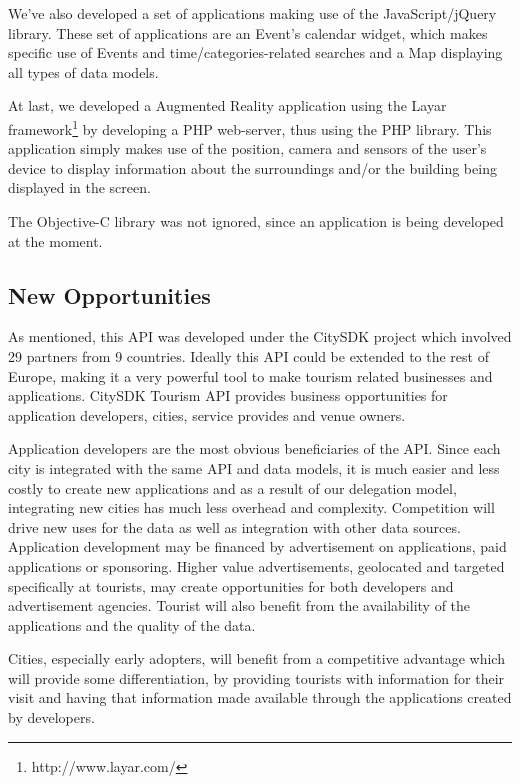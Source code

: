 \documentclass[times,doublespace]{ettauth}%
\begin{document}
We've also developed a set of applications making use of the JavaScript/jQuery library. These set of applications are an Event's calendar widget, which makes specific use of Events and time/categories-related searches and a Map displaying all types of data models.

At last, we developed a Augmented Reality application using the Layar framework\footnote{http://www.layar.com/} by developing a PHP web-server, thus using the PHP library. 
This application simply makes use of the position, camera and sensors of the user's device to display information about the surroundings and/or the building being displayed in the screen.

The Objective-C library was not ignored, since an application is being developed at the moment.

\subsection{New Opportunities}
As mentioned, this API was developed under the CitySDK project which involved 29 partners from 9 countries. 
Ideally this API could be extended to the rest of Europe, making it a very powerful tool to make tourism related businesses and applications.
CitySDK Tourism API provides business opportunities for application developers, cities, service provides and venue owners.

Application developers are the most obvious beneficiaries of the API.
Since each city is integrated with the same API and data models, it is much easier and less costly to create new applications and as a result of our delegation model, integrating new cities has much less overhead and complexity.
Competition will drive new uses for the data as well as integration with other data sources.
Application development may be financed by advertisement on applications, paid applications or sponsoring.
Higher value advertisements, geolocated and targeted specifically at tourists, may create opportunities for both developers and advertisement agencies.
Tourist will also benefit from the availability of the applications and the quality of the data.

Cities, especially early adopters, will benefit from a competitive advantage which will provide some differentiation, by providing tourists with information for their visit and having that information made available through the applications created by developers.
\end{document}
